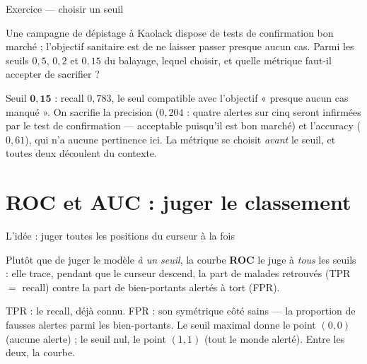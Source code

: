 \documentclass[aspectratio=169,11pt]{beamer}
\begin{document}
\begin{frame}{Exercice — choisir un seuil}
\begin{ucadrec}[Énoncé]
{\small Une campagne de dépistage à Kaolack dispose de tests de confirmation bon marché ; l'objectif sanitaire est de ne laisser passer presque aucun cas. Parmi les seuils $0{,}5$, $0{,}2$ et $0{,}15$ du balayage, lequel choisir, et quelle métrique faut-il accepter de sacrifier ?}
\end{ucadrec}
\pause
\begin{ucadex}[Correction]
{\small Seuil $\mathbf{0{,}15}$ : recall $0{,}783$, le seul compatible avec l'objectif « presque aucun cas manqué ». On sacrifie la precision ($0{,}204$ : quatre alertes sur cinq seront infirmées par le test de confirmation — acceptable puisqu'il est bon marché) et l'accuracy ($0{,}61$), qui n'a aucune pertinence ici. La métrique se choisit \emph{avant} le seuil, et toutes deux découlent du contexte.}
\end{ucadex}
\end{frame}

\section{ROC et AUC : juger le classement}

\begin{frame}{L'idée : juger toutes les positions du curseur à la fois}
\begin{ucaddef}
{\small Plutôt que de juger le modèle \emph{à un seuil}, la courbe \textbf{ROC} le juge à \emph{tous} les seuils : elle trace, pendant que le curseur descend, la part de malades retrouvés (TPR $=$ recall) contre la part de bien-portants alertés à tort (FPR).}
\end{ucaddef}
{\small TPR : le recall, déjà connu. FPR : son symétrique côté sains — la proportion de fausses alertes parmi les bien-portants. Le seuil maximal donne le point $(0,0)$ (aucune alerte) ; le seuil nul, le point $(1,1)$ (tout le monde alerté). Entre les deux, la courbe.}
\end{frame}
\end{document}

